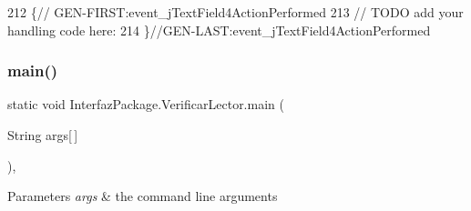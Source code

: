 \begin{DoxyCode}
212                                                                             \{\textcolor{comment}{//
      GEN-FIRST:event\_jTextField4ActionPerformed}
213         \textcolor{comment}{// TODO add your handling code here:}
214     \}\textcolor{comment}{//GEN-LAST:event\_jTextField4ActionPerformed}
\end{DoxyCode}
\mbox{\label{class_interfaz_package_1_1_verificar_lector_aae4c6809280705388d4de426bc738c83}} 
\subsubsection{\texorpdfstring{main()}{main()}}
{\footnotesize\ttfamily static void Interfaz\+Package.\+Verificar\+Lector.\+main (\begin{DoxyParamCaption}\item[{String}]{args\mbox{[}$\,$\mbox{]} }\end{DoxyParamCaption})\hspace{0.3cm}{\ttfamily [inline]}, {\ttfamily [static]}}


\begin{DoxyParams}{Parameters}
{\em args} & the command line arguments \\
\hline
\end{DoxyParams}


